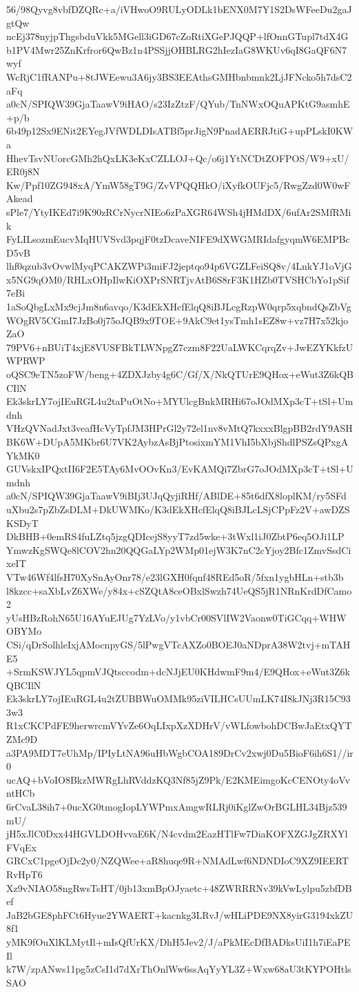 56/98Qyvg8vbfDZQRc+a/iVHwoO9RULyODLk1bENX0M7Y1S2DsWFeeDu2gaJgtQw
ncEj378nyjpThgsbduVkk5MGell3iGD67cZoRtiXGePJQQP+lfOnnGTupl7tdX4G
b1PV4Mwr25ZnKrfror6QwBz1n4PSSjjOHBLRG2hIezIaG8WKUv6qI8GaQF6N7wyf
WcRjC1fRANPu+8tJWEewu3A6jy3BS3EEAthsGMHbnbmnk2LjJFNcko5h7dsC2aFq
a0cN/SPIQW39GjaTaawV9iHAO/s23IzZtzF/QYub/TnNWxOQuAPKtG9asmhE+p/b
6b49p12Sx9ENit2EYegJVfWDLDIsATBf5prJigN9PnadAERRJtiG+upPLskI0KWa
HhevTsvNUorcGMh2hQxLK3eKxCZLLOJ+Qc/o6j1YtNCDtZOFPOS/W9+xU/ER0j8N
Kw/Ppf10ZG948xA/YmW58gT9G/ZvVPQQHkO/iXyfkOUFjc5/RwgZzd0W0wFAkead
sPle7/YtyIKEd7i9K90zRCrNycrNIEo6zPaXGR64WSh4jHMdDX/6ufAr2SMfRMik
FyLILsozmEucvMqHUVSvd3pqjF0tzDcaveNIFE9dXWGMRIdafgyqmW6EMPBcD5vB
lhf0qzub3vOvwlMyqPCAKZWPi3miFJ2jeptqo94p6VGZLFeiSQ8v/4LnkYJ1oVjG
x5NG9qOM0/RHLxOHpIlwKiOXPrSNRTjvAtB6S8rF3K1HZb0TVSHCbYo1pSif7eBi
1aSoQbgLxMx9cjJm8n6avqo/K3dEkXHcfElqQ8iBJLcgRzpW0qrp5xqbndQsZbVg
WOgRV5CGmI7JzBo0j75oJQB9x9TOE+9AkC9et1ysTmh1sEZ8w+vz7H7x52kjoZaO
79PV6+nBUiT4xjE8VUSFBkTLWNpgZ7czm8F22UaLWKCqrqZv+JwEZYKkfzUWPRWP
oQSC9eTN5zoFW/beng+4ZDXJzby4g6C/Gf/X/NkQTUrE9QHox+eWut3Z6kQBCIlN
Ek3skrLY7ojIEuRGL4u2taPuOtNo+MYUlcgBnkMRHi67oJOdMXp3cT+tSl+Umdnh
VHzQVNadJxt3veafHcVyTpfJM3HPrGl2y72el1nv8vMtQ7kxxxBlgpBB2rdY9ASH
BK6W+DUpA5MKbr6U7VK2AybzAsBjPtosixmYM1VhI5bXbjShdlPSZsQPxgAYkMK0
GUVskxIPQxtII6F2E5TAy6MvOOvKn3/EvKAMQi7ZbrG7oJOdMXp3cT+tSl+Umdnh
a0cN/SPIQW39GjaTaawV9iBIj3UJqQyjiRHf/ABlDE+85t6dfX8loplKM/ry5SFd
uXbu2s7pZbZsDLM+DkUWMKo/K3dEkXHcfElqQ8iBJLcLSjCPpFz2V+awDZSKSDyT
DkBHB+0emRS4fuLZtq5jzgQDIcejS8yyT7zd5wke+3tWxl1iJ0ZbtP6eq5OJi1LP
YmwzKgSWQe8lCOV2hn20QQGaLYp2WMp01ejW3K7nC2cYjoy2Bfc1ZmvSsdCixeIT
VTw46Wf4lfsH70XySnAyOnr78/e23lGXH0fqnf48REd5oR/5fxn1ygbHLn+stb3b
l8kzcc+saXbLvZ6XWe/y84x+cSZQtA8ceOBxlSwzh74UeQS5jR1NRnKrdDfCamo2
yUsHBzRohN65U16AYuEJUg7YzLVo/y1vbCr00SVlIW2Vaonw0TiGCqq+WHWOBYMo
CSi/qDrSolhleIxjAMocnpyGS/5lPwgVTcAXZo0BOEJ0aNDprA38W2tvj+mTAHE5
+SrmKSWJYL5qpmVJQtsccodm+dcNJjEU0KHdwmF9m4/E9QHox+eWut3Z6kQBCIlN
Ek3skrLY7ojIEuRGL4u2tZUBBWuOMMk95ziVILHCsUUmLK74I8kJNj3R15C933w3
R1xCKCPdFE9herwrcmVYvZe6OqLIxpXzXDHrV/vWLfowbohDCBwJaEtxQYTZMc9D
a3PA9MDT7eUhMp/IPIyLtNA96uHbWgbCOA189DrCv2xwj0Du5BioF6ih6S1//ir0
ucAQ+bVoIO8BkzMWRgLhRVddzKQ3Nf85jZ9Pk/E2KMEimgoKcCENOty4oVvntHCb
6rCvaL38ih7+0ucXG0tmogIopLYWPmxAmgwRLRj0iKglZwOrBGLHL34Bjz539mU/
jH5xJlC0Dxx44HGVLDOHvvaE6K/N4cvdm2EazHTlFw7DiaKOFXZGJgZRXYlFVqEx
GRCxC1pgeOjDc2y0/NZQWee+aR8huqe9R+NMAdLwf6NDNDIoC9XZ9IEERTRvHpT6
Xz9vNIAO58ngRwsTsHT/0jb13xmBpOJyaetc+48ZWRRRNv39kVwLylpu5zbfDBef
JaB2bGE8phFCt6Hyue2YWAERT+kacnkg3LRvJ/wHLiPDE9NX8yirG3194xkZU8f1
yMK9fOuXlKLMytIl+mIsQfUrKX/DhH5Jev2/J/aPkMEcDfBADksUiI1h7iEaPEIl
k7W/zpANws11pg5zCsI1d7dXrThOnlWw6ssAqYyYL3Z+Wxw68aU3tKYPOHtlsSAO
